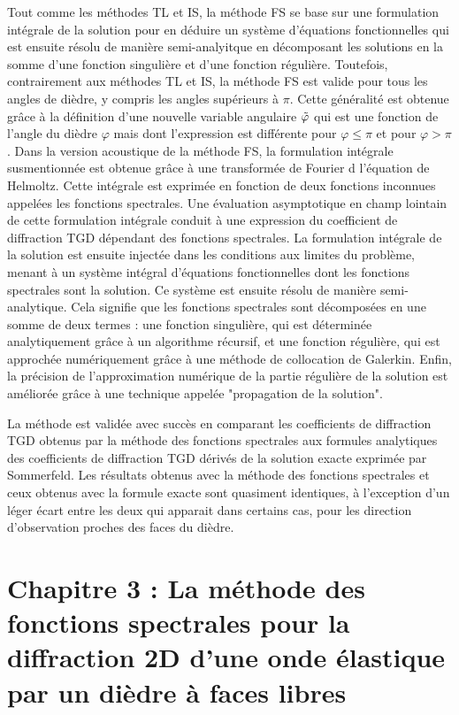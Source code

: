 Tout comme les méthodes TL et IS, la méthode FS se base sur une formulation intégrale de la solution pour en déduire un système d'équations fonctionnelles qui est ensuite résolu de manière semi-analyitque en décomposant les solutions en la somme d'une fonction singulière et d'une fonction régulière. Toutefois, contrairement aux méthodes TL et IS, la méthode FS est valide pour tous les angles de dièdre, y compris les angles supérieurs à $\pi$. Cette généralité est obtenue grâce à la définition d'une nouvelle variable angulaire $\tilde{\varphi}$ qui est une fonction de l'angle du dièdre $\varphi$ mais dont l'expression est différente pour $\varphi\leq \pi$ et pour $\varphi> \pi$. Dans la version acoustique de la méthode FS, la formulation intégrale susmentionnée est obtenue grâce à une transformée de Fourier d l'équation de Helmoltz. Cette intégrale est exprimée en fonction de deux fonctions inconnues appelées les fonctions spectrales. Une évaluation asymptotique en champ lointain de cette formulation intégrale conduit à une expression du coefficient de diffraction TGD dépendant des fonctions spectrales. La formulation intégrale de la solution est ensuite injectée dans les conditions aux limites du problème, menant à un système intégral d'équations fonctionnelles dont les fonctions spectrales sont la solution. Ce système est ensuite résolu de manière semi-analytique. Cela signifie que les fonctions spectrales sont décomposées en une somme de deux termes : une fonction singulière, qui est déterminée analytiquement grâce à un algorithme récursif, et une fonction régulière, qui est approchée numériquement grâce à une méthode de collocation de Galerkin. Enfin, la précision de l'approximation numérique de la partie régulière de la solution est améliorée grâce à une technique appelée "propagation de la solution".

La méthode est validée avec succès en comparant les coefficients de diffraction TGD obtenus par la méthode des fonctions spectrales aux formules analytiques des coefficients de diffraction TGD dérivés de la solution exacte exprimée par Sommerfeld. Les résultats obtenus avec la méthode des fonctions spectrales et ceux obtenus avec la formule exacte sont quasiment identiques, à l'exception d'un léger écart entre les deux qui apparait dans certains cas, pour les direction d'observation proches des faces du dièdre.

\section[Résumé du chapitre 3]{Chapitre 3 : La méthode des fonctions spectrales pour la diffraction 2D d'une onde élastique par un dièdre à faces libres}

